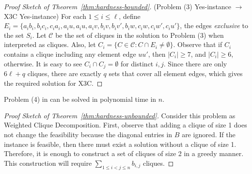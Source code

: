 \begin{proof}[Proof Sketch of Theorem~\ref{thm:hardness-bounded}]
  (Problem (3) Yes-instance $\to$ X3C Yes-instance)
  For each $1 \leq i \leq \ell$, define\newline
  $E_i=\{a_ib_i, b_ic_i, c_ia_i, a_iu, a_iu, a_iv, b_iv, b_iv', b_iw, c_iw, c_iw', c_iu'\}$, the edges \textit{exclusive} to the set $S_i$.
  Let $\mathcal{C}$ be the set of cliques in the solution to Problem (3) when interpreted as cliques.
  Also, let $C_i=\{C \in \mathcal{C}: C \cap E_i \neq \emptyset\}$.
  Observe that if $C_i$ contains a clique including any element edge $uu'$, then $|C_i|\geq 7$,
  and $|C_i|\geq 6$, otherwise. It is easy to see $C_i \cap C_j=\emptyset$ for distinct $i,j$.
  Since there are only $6\ell + q$ cliques, there are exactly $q$ sets that cover all element edges,
  which gives the required solution for X3C.
\end{proof}

\begin{thm}\label{thm:hardness-unbounded}
  Problem (4) in  can be solved in polynomial time in $n$.
\end{thm}

\begin{proof}[Proof Sketch of Theorem~\ref{thm:hardness-unbounded}]
  Consider this problem as Weighted Clique Decomposition.
  First, observe that adding a clique of size 1 does not change the feasibility
  because the diagonal entries in $B$ are ignored.
  If the instance is feasible, then there must exist a solution without a clique of size 1.
  Therefore, it is enough to construct a set of cliques of size 2 in a greedy manner.
  This construction will require $\sum_{1 \leq i < j \leq n}b_{i,j}$ cliques.
\end{proof}
